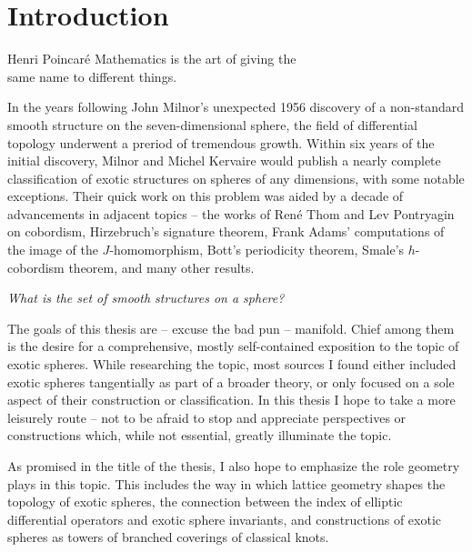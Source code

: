 \chapter{Introduction}\label{chap:introduction}

\begin{epigraph}{16em}{Henri Poincar\'e}
Mathematics is the art of giving the \\
same name to different things.
\end{epigraph}

In the years following John Milnor's unexpected 1956 discovery of a non-standard smooth structure on the seven-dimensional sphere, the field of differential topology underwent a preriod of tremendous growth. Within six years of the initial discovery, Milnor and Michel Kervaire would publish a nearly complete classification of exotic structures on spheres of any dimensions, with some notable exceptions. 
Their quick work on this problem was aided by a decade of advancements in adjacent topics -- the works of Ren\'e Thom and Lev Pontryagin on cobordism, Hirzebruch's signature theorem, Frank Adams' computations of the image of the $J$-homomorphism, Bott's periodicity theorem, Smale's $h$-cobordism theorem, and many other results. 


\begin{center}
  \textsl{What is the set of smooth structures on a sphere?}
\end{center}

The goals of this thesis are -- excuse the bad pun -- manifold. Chief among them is the desire for a comprehensive, mostly self-contained exposition to the topic of exotic spheres. While researching the topic, most sources I found either included exotic spheres tangentially as part of a broader theory, or only focused on a sole aspect of their construction or classification.
In this thesis I hope to take a more leisurely route -- not to be afraid to stop and appreciate perspectives or constructions which, while not essential, greatly illuminate the topic.

As promised in the title of the thesis, I also hope to emphasize the role geometry plays in this topic.
This includes the way in which lattice geometry shapes the topology of exotic spheres, the connection between the index of elliptic differential operators and exotic sphere invariants, and constructions of exotic spheres as towers of branched coverings of classical knots. 

